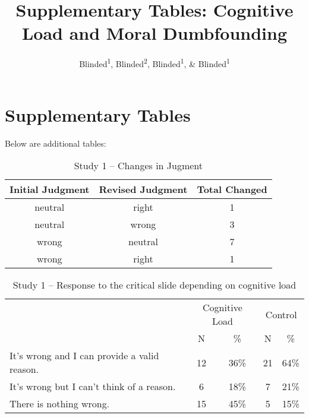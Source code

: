 \documentclass[
  american,
  man,floatsintext]{apa7}
\title{Supplementary Tables: Cognitive Load and Moral Dumbfounding}
\author{Blinded\textsuperscript{1}, Blinded\textsuperscript{2}, Blinded\textsuperscript{1}, \& Blinded\textsuperscript{1}}
\date{}
\affiliation{\vspace{0.5cm}\textsuperscript{1} Blinded\\\textsuperscript{2} Blinded}
\begin{document}
\maketitle

\hypertarget{supplementary-tables}{%
\section{Supplementary Tables}\label{supplementary-tables}}

Below are additional tables:

\newpage

\begin{table}[tbp]

\begin{center}
\begin{threeparttable}

\caption{\label{tab:tabS1change}Study 1 – Changes in Jugment}

\begin{tabular}{ccc}
\toprule
Initial Judgment & \multicolumn{1}{c}{Revised Judgment} & \multicolumn{1}{c}{Total Changed}\\
\midrule
neutral & right & 1\\
neutral & wrong & 3\\
wrong & neutral & 7\\
wrong & right & 1\\
\bottomrule
\end{tabular}

\end{threeparttable}
\end{center}

\end{table}

\begin{table}[tbp]

\begin{center}
\begin{threeparttable}

\caption{\label{tab:tabS1tab1dumb1all}Study 1 – Response to the critical slide depending on cognitive load}

\begin{tabular}{lcccc}
\toprule
 & \multicolumn{2}{c}{Cognitive Load} & \multicolumn{2}{c}{Control} \\
\cmidrule(r){2-3} \cmidrule(r){4-5}
 & \multicolumn{1}{c}{N} & \multicolumn{1}{c}{\%} & \multicolumn{1}{c}{N} & \multicolumn{1}{c}{\%}\\
\midrule
It's wrong and I can provide a valid reason. & 12 & 36\% & 21 & 64\%\\
It's wrong but I can't think of a reason. & 6 & 18\% & 7 & 21\%\\
There is nothing wrong. & 15 & 45\% & 5 & 15\%\\
\bottomrule
\end{tabular}

\end{threeparttable}
\end{center}

\end{table}
\end{document}
